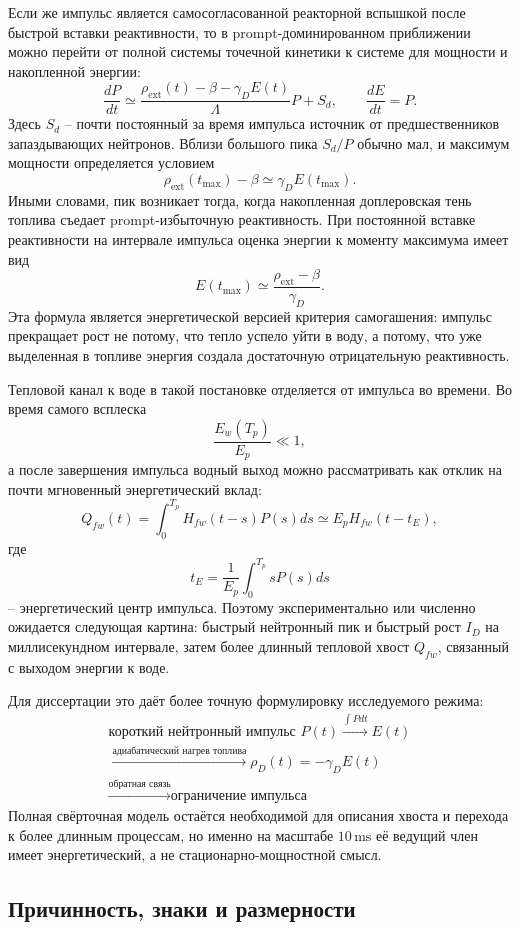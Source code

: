 \documentclass[12pt]{article}
\begin{document}
Если же импульс является самосогласованной реакторной вспышкой после быстрой вставки реактивности, то в prompt-доминированном приближении можно перейти от полной системы точечной кинетики к системе для мощности и накопленной энергии:
\[
\frac{dP}{dt}
\simeq
\frac{\rho_{\mathrm{ext}}(t)-\beta-\gamma_D E(t)}{\Lambda}P
+S_d,
\qquad
\frac{dE}{dt}=P.
\]
Здесь \(S_d\) -- почти постоянный за время импульса источник от предшественников запаздывающих нейтронов. Вблизи большого пика \(S_d/P\) обычно мал, и максимум мощности определяется условием
\[
\rho_{\mathrm{ext}}(t_{\max})-\beta
\simeq
\gamma_D E(t_{\max}).
\]
Иными словами, пик возникает тогда, когда накопленная доплеровская тень топлива съедает prompt-избыточную реактивность. При постоянной вставке реактивности на интервале импульса оценка энергии к моменту максимума имеет вид
\[
E(t_{\max})\simeq
\frac{\rho_{\mathrm{ext}}-\beta}{\gamma_D}.
\]
Эта формула является энергетической версией критерия самогашения: импульс прекращает рост не потому, что тепло успело уйти в воду, а потому, что уже выделенная в топливе энергия создала достаточную отрицательную реактивность.

Тепловой канал к воде в такой постановке отделяется от импульса во времени. Во время самого всплеска
\[
\frac{E_w(T_p)}{E_p}\ll 1,
\]
а после завершения импульса водный выход можно рассматривать как отклик на почти мгновенный энергетический вклад:
\[
Q_{fw}(t)
=
\int_0^{T_p}H_{fw}(t-s)P(s)ds
\simeq
E_p H_{fw}(t-t_E),
\]
где
\[
t_E=\frac{1}{E_p}\int_0^{T_p}sP(s)ds
\]
-- энергетический центр импульса. Поэтому экспериментально или численно ожидается следующая картина: быстрый нейтронный пик и быстрый рост \(I_D\) на миллисекундном интервале, затем более длинный тепловой хвост \(Q_{fw}\), связанный с выходом энергии к воде.

Для диссертации это даёт более точную формулировку исследуемого режима:
\[
\boxed{
\begin{gathered}
\text{короткий нейтронный импульс }P(t)
\xrightarrow{\int Pdt}
E(t)\\
\xrightarrow{\text{адиабатический нагрев топлива}}
\rho_D(t)=-\gamma_D E(t)\\
\xrightarrow{\text{обратная связь}}
\text{ограничение импульса}
\end{gathered}
}
\]
Полная свёрточная модель остаётся необходимой для описания хвоста и перехода к более длинным процессам, но именно на масштабе \(10\,\mathrm{ms}\) её ведущий член имеет энергетический, а не стационарно-мощностной смысл.

\subsection{Причинность, знаки и размерности}
\end{document}
